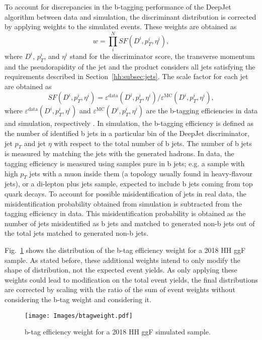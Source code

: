 \documentclass[../main.tex]{subfiles}
\begin{document}
To account for discrepancies in the b-tagging performance of the DeepJet algorithm between data and simulation, the discriminant distribution is corrected by applying weights to the simulated events. These weights are obtained as
\begin{equation}
\label{hh:eq:btag_sf}
w = \prod_i^{N} SF(D^i, p_T^i, \eta^i),
\end{equation}
where $D^i$, $p_T^i$, and $\eta^i$ stand for the discriminator score, the transverse momentum and the pseudorapidity of the jet and the product  considers all jets satisfying the requirements described in Section~\ref{hh:subsec:jets}. The scale factor for each jet are obtained as
\begin{equation}
SF(D^i, p_T^i, \eta^i) = \varepsilon^\text{data}(D^i, p_T^i, \eta^i)/\varepsilon^\text{MC}(D^i, p_T^i, \eta^i),
\end{equation}
where $\varepsilon^\text{data}(D^i, p_T^i, \eta^i)$ and $\varepsilon^\text{MC}(D^i, p_T^i, \eta^i)$ are the b-tagging efficiencies in data and simulation, respectively \cite{hh:analysis:btag}. In simulation, the b-tagging efficiency is defined as the number of identified b jets in a particular bin of the DeepJet discriminator, jet $p_T$ and jet $\eta$ with respect to the total number of b jets. The number of b jets is measured by matching the jets with the generated hadrons. In data, the tagging efficiency is measured using samples pure in b jets; e.g. a sample with high $p_T$ jets with a muon inside them (a topology usually found in heavy-flavour jets), or a di-lepton plus jets sample, expected to include b jets coming from top quark decays. To account for possible misidentification of jets in real data, the misidentification probability obtained from simulation is subtracted from the tagging efficiency in data. This misidentification probability is obtained as the number of jets misidentified as b jets and matched to generated non-b jets out of the total jets matched to generated non-b jets.

Fig.~\ref{hh:fig:btag_weight} shows the distribution of the b-tag efficiency weight for a 2018 HH ggF sample. As stated before, these additional weights intend to only modify the shape of distribution, not the expected event yields. As only applying these weights could lead to modification on the total event yields, the final distributions are corrected by scaling with the ratio of the sum of event weights without considering the b-tag weight and considering it.

\begin{figure}[h!]
\begin{center}
\texttt{[image: Images/btagweight.pdf]}
\end{center}
\caption[b-tag efficiency scale factor]{b-tag efficiency weight for a 2018 HH ggF simulated sample.}
\label{hh:fig:btag_weight}
\end{figure}
\end{document}
